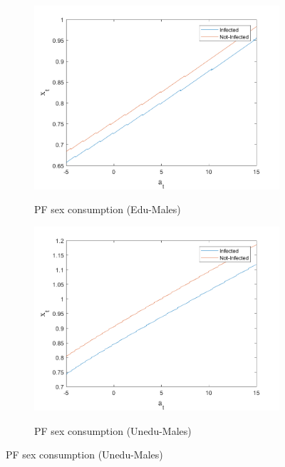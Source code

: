 \newpage
\begin{figure}[H]\caption{Miopic onset of the epidemic, continuation:}
\begin{subfigure}{0.5\textwidth}\caption{PF sex consumption (Edu-Males)}
   \includegraphics[width=\linewidth,height = 0.22\textheight]{figures/mio/FIG9.png}
    \label{fig_dert}
\end{subfigure}
\hspace*{\fill}
\begin{subfigure}{0.5\textwidth}\caption{PF sex consumption (Unedu-Males)}
   \includegraphics[width=\linewidth,height = 0.22\textheight]{figures/mio/FIG10.png}
    \label{fig:x_b}
\end{subfigure}

\end{figure}
